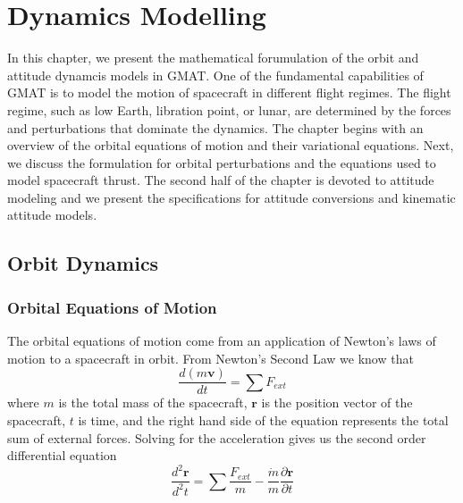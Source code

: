 \chapter{Dynamics Modelling}

In this chapter, we
present the mathematical forumulation of the orbit and attitude dynamcis models in GMAT.
One of the fundamental capabilities of GMAT is to model the motion
of spacecraft in different flight regimes.  The flight regime,
such as low Earth, libration point, or lunar, are determined by the
forces and perturbations that dominate the dynamics.
The chapter begins with an overview of
the orbital equations of motion and their variational equations.  Next, we
discuss the formulation for orbital perturbations and the equations used to model
spacecraft thrust.  The second half of the chapter is devoted to attitude modeling and
we present the specifications for  attitude conversions and kinematic attitude models.


\section{Orbit Dynamics}

\subsection{Orbital Equations of Motion}

The orbital equations of motion come from an application of Newton's laws of motion to a spacecraft in orbit.  From Newton's Second Law we know that
%
\begin{equation}
     \frac{d (m\mathbf{v})}{d t} = \sum F_{ext}
\end{equation}
%
where $m$ is the total mass of the spacecraft, $\mathbf{r}$ is the position vector of the spacecraft, $t$ is time, and the right hand side of the equation represents the total sum of external forces.  Solving for the acceleration gives us the
second order differential equation
%
\begin{equation}
   \frac{d^2 \mathbf{r}}{d^2 t} = \sum \frac{F_{ext}}{m} - \frac{\dot{m}}{m}\frac{\partial \mathbf{r}}{\partial t}
   \label{Eq:SCAcc}
\end{equation}
%

